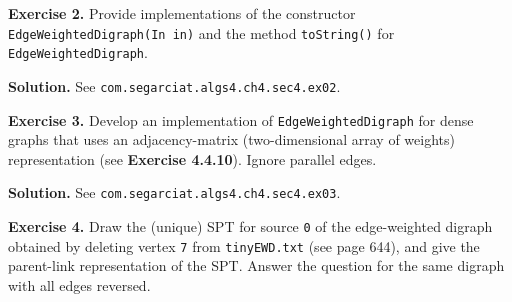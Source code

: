 \documentclass[12pt, a4paper]{article}
\newenvironment{ex}[2][Exercise]
{\par\medskip\noindent \textbf{#1 #2.}}
{\medskip}
\newenvironment{sol}[1][Solution]
{\par\medskip\noindent \textbf{#1.} }
{\medskip}
\begin{document}
	\begin{ex}{2}
		Provide implementations of the constructor \texttt{EdgeWeightedDigraph(In in)}
		and the method \texttt{toString()} for \texttt{EdgeWeightedDigraph}.
	\end{ex}
	\begin{sol}
		See \texttt{com.segarciat.algs4.ch4.sec4.ex02}.
	\end{sol}
	\begin{ex}{3}
		Develop an implementation of \texttt{EdgeWeightedDigraph} for dense graphs that
		uses an adjacency-matrix (two-dimensional array of weights) representation
		(see \textbf{Exercise 4.4.10}). Ignore parallel edges.
	\end{ex}
	\begin{sol}
		See \texttt{com.segarciat.algs4.ch4.sec4.ex03}.
	\end{sol}
	\begin{ex}{4}
		Draw the (unique) SPT for source \texttt{0} of the edge-weighted digraph obtained
		by deleting vertex \texttt{7} from \texttt{tinyEWD.txt} (see page 644), and give
		the parent-link representation of the SPT. Answer the question for the same digraph
		with all edges reversed.
	\end{ex}
\end{document}
